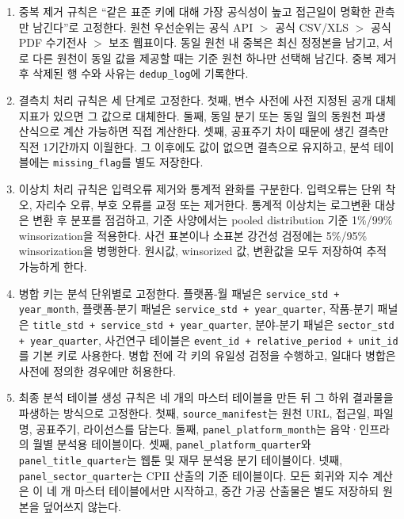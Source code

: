 \documentclass[11pt,a4paper]{report}
\begin{document}
\begin{enumerate}[label=\arabic*.]
  \item 중복 제거 규칙은 ``같은 표준 키에 대해 가장 공식성이 높고 접근일이 명확한 관측만 남긴다''로 고정한다. 원천 우선순위는 공식 API $>$ 공식 CSV/XLS $>$ 공식 PDF 수기전사 $>$ 보조 웹표이다. 동일 원천 내 중복은 최신 정정본을 남기고, 서로 다른 원천이 동일 값을 제공할 때는 기준 원천 하나만 선택해 남긴다. 중복 제거 후 삭제된 행 수와 사유는 \texttt{dedup\_log}에 기록한다.
  \item 결측치 처리 규칙은 세 단계로 고정한다. 첫째, 변수 사전에 사전 지정된 공개 대체지표가 있으면 그 값으로 대체한다. 둘째, 동일 분기 또는 동일 월의 동원천 파생 산식으로 계산 가능하면 직접 계산한다. 셋째, 공표주기 차이 때문에 생긴 결측만 직전 1기간까지 이월한다. 그 이후에도 값이 없으면 결측으로 유지하고, 분석 테이블에는 \texttt{missing\_flag}를 별도 저장한다.
  \item 이상치 처리 규칙은 입력오류 제거와 통계적 완화를 구분한다. 입력오류는 단위 착오, 자리수 오류, 부호 오류를 교정 또는 제거한다. 통계적 이상치는 로그변환 대상은 변환 후 분포를 점검하고, 기준 사양에서는 pooled distribution 기준 1\%/99\% winsorization을 적용한다. 사건 표본이나 소표본 강건성 검정에는 5\%/95\% winsorization을 병행한다. 원시값, winsorized 값, 변환값을 모두 저장하여 추적 가능하게 한다.
  \item 병합 키는 분석 단위별로 고정한다. 플랫폼-월 패널은 \texttt{service\_std + year\_month}, 플랫폼-분기 패널은 \texttt{service\_std + year\_quarter}, 작품-분기 패널은 \nolinkurl{title_std + service_std + year_quarter}, 분야-분기 패널은 \texttt{sector\_std + year\_quarter}, 사건연구 테이블은 \nolinkurl{event_id + relative_period + unit_id}를 기본 키로 사용한다. 병합 전에 각 키의 유일성 검정을 수행하고, 일대다 병합은 사전에 정의한 경우에만 허용한다.
  \item 최종 분석 테이블 생성 규칙은 네 개의 마스터 테이블을 만든 뒤 그 하위 결과물을 파생하는 방식으로 고정한다. 첫째, \texttt{source\_manifest}는 원천 URL, 접근일, 파일명, 공표주기, 라이선스를 담는다. 둘째, \nolinkurl{panel_platform_month}는 음악·인프라의 월별 분석용 테이블이다. 셋째, \nolinkurl{panel_platform_quarter}와 \nolinkurl{panel_title_quarter}는 웹툰 및 재무 분석용 분기 테이블이다. 넷째, \nolinkurl{panel_sector_quarter}는 CPII 산출의 기준 테이블이다. 모든 회귀와 지수 계산은 이 네 개 마스터 테이블에서만 시작하고, 중간 가공 산출물은 별도 저장하되 원본을 덮어쓰지 않는다.
\end{enumerate}
\end{document}
